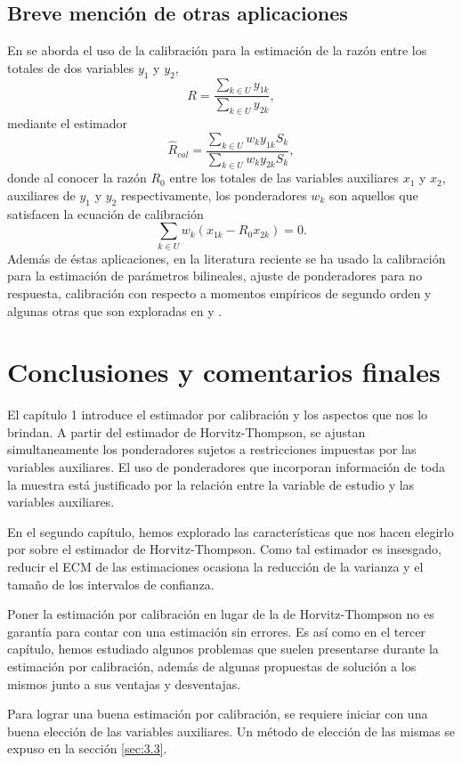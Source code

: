 \documentclass[a4paper,twoside,openright,12pt]{book}
\theoremstyle{definition}
\numberwithin{equation}{chapter}
\numberwithin{figure}{chapter}
\numberwithin{table}{chapter}
\numberwithin{theorem}{chapter}
\numberwithin{lemma}{chapter}
\begin{document}
\section{Breve mención de otras aplicaciones}
En \cite{plikusas} se aborda el uso de la calibración  para la estimación de la razón entre los totales de dos variables $y_1$ y $y_2$,
$$R=\frac{\sum_{k\in U} y_{1k}}{\sum_{k\in U} y_{2k}},$$
mediante el estimador
$$\hat R_{cal}=\frac{\sum_{k\in U} w_k y_{1k} S_k}{\sum_{k\in U} w_k y_{2k} S_k},$$
donde al conocer la razón $R_0$ entre los totales de las variables auxiliares $x_1$ y $x_2$, auxiliares de $y_1$ y $y_2$ respectivamente, 
los ponderadores $w_k$ son aquellos que satisfacen la ecuación de calibración
$$\sum_{k \in U}w_k\left(x_{1k}-R_0x_{2k}\right)=0.$$
Además de éstas aplicaciones, en la literatura reciente se ha usado la calibración para la estimación de parámetros bilineales, ajuste de ponderadores para no respuesta, calibración con respecto a momentos empíricos de segundo orden y algunas otras que son exploradas en \cite{CIS-252935} y \cite{plikusas}.
\chapter*{Conclusiones y comentarios finales}
El capítulo 1 introduce el estimador por calibración y los aspectos que nos lo brindan. A partir del estimador de Horvitz-Thompson, se ajustan simultaneamente los ponderadores sujetos a restricciones impuestas por las variables auxiliares. El uso de ponderadores que incorporan información de toda la muestra está justificado por la relación entre la variable de estudio y las variables auxiliares.

En el segundo capítulo, hemos explorado las características que nos hacen elegirlo por sobre el estimador de Horvitz-Thompson. Como tal estimador es insesgado, reducir el ECM de las estimaciones ocasiona la reducción de la varianza y el tamaño de los intervalos de confianza.

Poner la estimación por calibración en lugar de la de Horvitz-Thompson no es garantía para contar con una estimación sin errores. Es así como en el tercer capítulo, hemos estudiado algunos problemas que suelen presentarse durante la estimación por calibración, además de algunas propuestas de solución a los mismos junto a sus ventajas y desventajas. 

Para lograr una buena estimación por calibración, se requiere iniciar con una buena elección de las variables auxiliares. Un método de elección de las mismas se expuso en la sección \ref{sec:3.3}.
\end{document}
